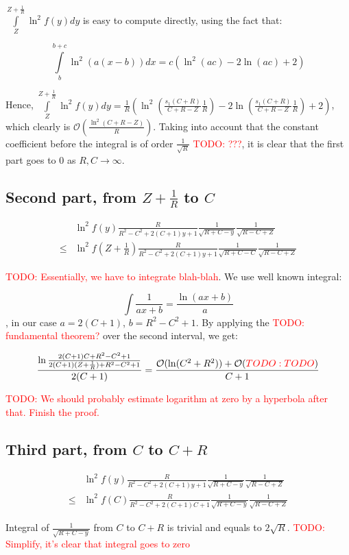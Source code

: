 \documentclass[12pt, a4paper]{article}
\newcommand{\mcO}{\mathcal{O}}
\newcommand{\todo}[1]{{\large \textcolor{red}{TODO: #1}}}
\begin{document}
$\int\limits_{Z}^{Z + \frac{1}{R}} \ln^2 f(y) dy$ is easy to compute directly, using the fact that:

\[
    \int\limits_b^{b + c} \ln^2 (a (x - b)) dx = c (\ln^2(a c) - 2 \ln (a c) + 2)
\]

Hence, $\int\limits_{Z}^{Z + \frac{1}{R}} \ln^2 f(y) dy = \frac{1}{R} ( \ln^2 (\frac{s_1(C + R)}{C + R - Z} \frac{1}{R}) - 2 \ln (\frac{s_1(C + R)}{C + R - Z} \frac{1}{R}) + 2)$, which clearly is $\mcO(\frac{\ln^2(C + R - Z)}{R})$. Taking into account that the constant coefficient before the integral is of order $\frac{1}{\sqrt{R}}$ \todo{???}, it is clear that the first part goes to $0$ as $R, C \to \infty$.


\subsection*{Second part, from $Z + \frac{1}{R}$ to $C$}

\begin{align*}
       & \ln^2 f(y) \frac{R}{R^2 - C^2 + 2 (C + 1) y + 1} \frac{1}{\sqrt{R + C - y}} \frac{1}{\sqrt{R - C + Z}}
\\ \le & \ln^2 f(Z + \frac{1}{R}) \frac{R}{R^2 - C^2 + 2 (C + 1) y + 1} \frac{1}{\sqrt{R + C - C}} \frac{1}{\sqrt{R - C + Z}}
\end{align*}

\todo{Essentially, we have to integrate blah-blah}. We use well known integral:

\[
\int \frac{1}{a x + b} = \frac{\ln (a x + b)}{a}
\]
, in our case $a = 2 (C + 1)$, $b = R^2 - C^2 + 1$. By applying the \todo{fundamental theorem?} over the second interval, we get:

\[
\frac{\ln \frac{2 (C + 1) C + R^2 - C^2 + 1}{2 (C + 1) (Z + \frac{1}{R}) + R^2 - C^2 + 1}}{2 (C + 1)} = \frac{\mcO(\ln(C^2 + R^2)) + \mcO(\todo{TODO})}{C + 1}
\]

\todo{We should probably estimate logarithm at zero by a hyperbola after that. Finish the proof.}

\subsection*{Third part, from $C$ to $C + R$}

\begin{align*}
       & \ln^2 f(y) \frac{R}{R^2 - C^2 + 2 (C + 1) y + 1} \frac{1}{\sqrt{R + C - y}} \frac{1}{\sqrt{R - C + Z}}
\\ \le & \ln^2 f(C) \frac{R}{R^2 - C^2 + 2 (C + 1) C + 1} \frac{1}{\sqrt{R + C - y}} \frac{1}{\sqrt{R - C + Z}}
\end{align*}

Integral of $\frac{1}{\sqrt{R + C - y}}$ from $C$ to $C + R$ is trivial and equals to $2 \sqrt{R}$. \todo{Simplify, it's clear that integral goes to zero}
\end{document}
